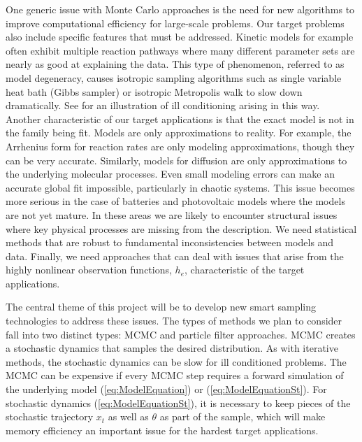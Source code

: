 \documentclass[11pt]{article}
\begin{document}
One generic issue with Monte Carlo approaches
is the need for new algorithms to improve computational efficiency for large-scale problems.
Our target problems also include specific features that must be addressed.
Kinetic models for example often exhibit multiple reaction pathways where
many different parameter sets are nearly as good at explaining the data.
This type of phenomenon, referred to as model degeneracy,
causes isotropic sampling algorithms such as single variable heat bath (Gibbs sampler) or isotropic
Metropolis walk to slow down dramatically.
See \cite{HouStretch} for an illustration of ill conditioning arising in this way.
Another characteristic of our target applications is that
the exact model is not in the family being fit.
Models are only approximations to reality.
For example, the Arrhenius form for reaction rates are only modeling approximations, though they can be very accurate.
Similarly, models for diffusion are only approximations to the underlying molecular processes.
Even small modeling errors can make an accurate global fit impossible, particularly in chaotic systems.
This issue becomes more serious in the case of batteries and photovoltaic models where the models
are not yet mature.  In these areas we are likely to encounter structural issues where key physical
processes are missing from the description.
We need statistical methods that are robust to fundamental inconsistencies between models and data.
Finally, we need approaches that can deal with issues that arise from the highly nonlinear observation
functions, $h_e$, characteristic of the target applications.

The central theme of this project will be to develop new smart sampling technologies 
to address these issues.
The types of methods we plan to consider fall into two distinct types:  
MCMC and particle filter approaches.
MCMC creates a stochastic dynamics that samples the desired distribution.
As with iterative methods, the stochastic dynamics can be slow for ill conditioned problems.
The MCMC can be expensive if every MCMC step requires a forward simulation of the underlying model
(\ref{eq:ModelEquation}) or (\ref{eq:ModelEquationSt}).
For stochastic dynamics (\ref{eq:ModelEquationSt}), it is necessary to keep pieces of the 
stochastic trajectory $x_t$ as well as $\theta$ as part of the sample, which will make
memory efficiency an important issue for the hardest target applications.
\end{document}
